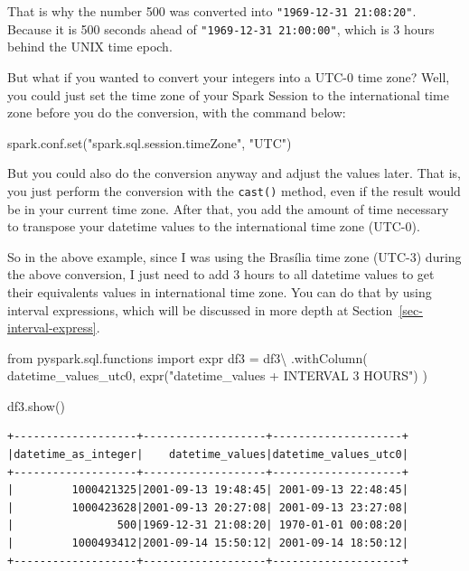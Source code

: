\documentclass[
  11pt,
  letterpaper,
  DIV=11,
  numbers=noendperiod]{scrreprt}
\newenvironment{Shaded}{\begin{snugshade}}{\end{snugshade}}
\newcommand{\BuiltInTok}[1]{\textcolor[rgb]{0.00,0.23,0.31}{#1}}
\newcommand{\ImportTok}[1]{\textcolor[rgb]{0.00,0.46,0.62}{#1}}
\newcommand{\NormalTok}[1]{\textcolor[rgb]{0.00,0.23,0.31}{#1}}
\newcommand{\OperatorTok}[1]{\textcolor[rgb]{0.37,0.37,0.37}{#1}}
\newcommand{\StringTok}[1]{\textcolor[rgb]{0.13,0.47,0.30}{#1}}
\begin{document}
That is why the number 500 was converted into
\texttt{"1969-12-31\ 21:08:20"}. Because it is 500 seconds ahead of
\texttt{"1969-12-31\ 21:00:00"}, which is 3 hours behind the UNIX time
epoch.

But what if you wanted to convert your integers into a UTC-0 time zone?
Well, you could just set the time zone of your Spark Session to the
international time zone before you do the conversion, with the command
below:

\begin{Shaded}
\begin{Highlighting}[]
\NormalTok{spark.conf.}\BuiltInTok{set}\NormalTok{(}\StringTok{"spark.sql.session.timeZone"}\NormalTok{, }\StringTok{"UTC"}\NormalTok{)}
\end{Highlighting}
\end{Shaded}

But you could also do the conversion anyway and adjust the values later.
That is, you just perform the conversion with the \texttt{cast()}
method, even if the result would be in your current time zone. After
that, you add the amount of time necessary to transpose your datetime
values to the international time zone (UTC-0).

So in the above example, since I was using the Brasília time zone
(UTC-3) during the above conversion, I just need to add 3 hours to all
datetime values to get their equivalents values in international time
zone. You can do that by using interval expressions, which will be
discussed in more depth at Section~\ref{sec-interval-express}.

\begin{Shaded}
\begin{Highlighting}[]
\ImportTok{from}\NormalTok{ pyspark.sql.functions }\ImportTok{import}\NormalTok{ expr}
\NormalTok{df3 }\OperatorTok{=}\NormalTok{ df3}\OperatorTok{\textbackslash{}}
\NormalTok{    .withColumn(}
        \StringTok{\textquotesingle{}datetime\_values\_utc0\textquotesingle{}}\NormalTok{,}
\NormalTok{        expr(}\StringTok{"datetime\_values + INTERVAL 3 HOURS"}\NormalTok{)}
\NormalTok{    )}

\NormalTok{df3.show()}
\end{Highlighting}
\end{Shaded}

\begin{verbatim}
+-------------------+-------------------+--------------------+
|datetime_as_integer|    datetime_values|datetime_values_utc0|
+-------------------+-------------------+--------------------+
|         1000421325|2001-09-13 19:48:45| 2001-09-13 22:48:45|
|         1000423628|2001-09-13 20:27:08| 2001-09-13 23:27:08|
|                500|1969-12-31 21:08:20| 1970-01-01 00:08:20|
|         1000493412|2001-09-14 15:50:12| 2001-09-14 18:50:12|
+-------------------+-------------------+--------------------+
\end{verbatim}
\end{document}
